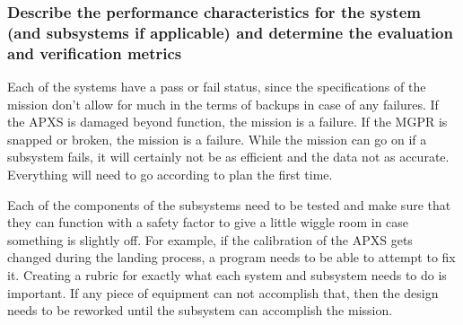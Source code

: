 \documentclass[%
 portrait,
 aapm,
 mph,%
 amsmath,amssymb,
 reprint,%
]{revtex4-2}
\begin{document}
\subsubsection{Describe the performance characteristics for the system (and subsystems
if applicable) and determine the evaluation and verification metrics}
Each of the systems have a pass or fail status, since the specifications of the mission don’t allow for much in the terms of backups in case of any failures.  If the APXS is damaged beyond function, the mission is a failure. If the MGPR is snapped or broken, the mission is a failure. While the mission can go on if a subsystem fails, it will certainly not be as efficient and the data not as accurate. Everything will need to go according to plan the first time.

Each of the components of the subsystems need to be tested and make sure that they can function with a safety factor to give a little wiggle room in case something is slightly off.  For example, if the calibration of the APXS gets changed during the landing process, a program needs to be able to attempt to fix it.  Creating a rubric for exactly what each system and subsystem needs to do is important.  If any piece of equipment can not accomplish that, then the design needs to be reworked until the subsystem can accomplish the mission.
\end{document}
